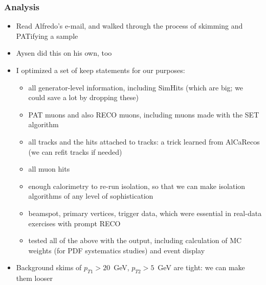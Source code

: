 \documentclass[compress]{beamer}
\begin{document}
\begin{frame}
\frametitle{Analysis}

\scriptsize
\begin{itemize}
\item Read Alfredo's e-mail, and walked through the process of skimming and PATifying a sample
\item Aysen did this on his own, too
\item I optimized a set of keep statements for our purposes:
\begin{itemize}
\item \scriptsize all generator-level information, including SimHits (which are big; we could save a lot by dropping these)
\item \scriptsize PAT muons and also RECO muons, including muons made with the SET algorithm
\item \scriptsize all tracks and the hits attached to tracks: a trick learned from AlCaRecos (we can refit tracks if needed)
\item \scriptsize all muon hits
\item \scriptsize enough calorimetry to re-run isolation, so that we can make isolation algorithms of any level of sophistication
\item \scriptsize beamspot, primary vertices, trigger data, which were essential in real-data exercises with prompt RECO
\item \scriptsize tested all of the above with the output, including calculation of MC weights (for PDF systematics studies) and event display
\end{itemize}
\item Background skims of $p_{T1} > 20$~GeV, $p_{T2} > 5$~GeV are tight: we can make them looser
\end{itemize}
\end{frame}
\end{document}
